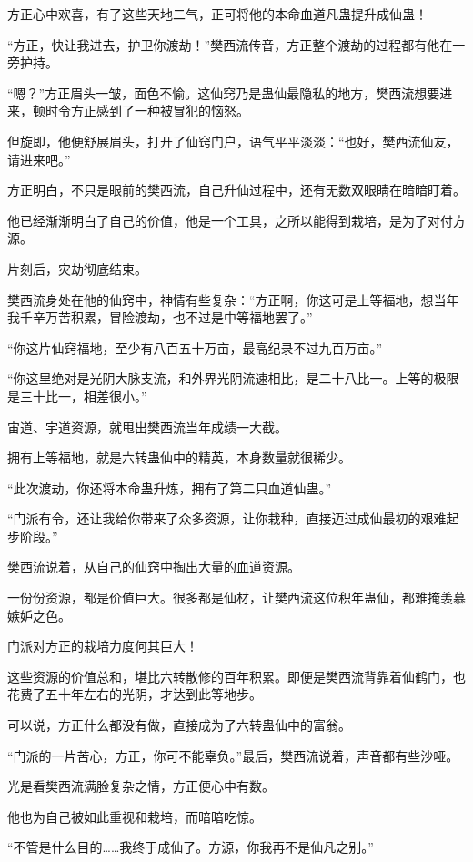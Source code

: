 \begin{this_body}
方正心中欢喜，有了这些天地二气，正可将他的本命血道凡蛊提升成仙蛊！

“方正，快让我进去，护卫你渡劫！”樊西流传音，方正整个渡劫的过程都有他在一旁护持。

“嗯？”方正眉头一皱，面色不愉。这仙窍乃是蛊仙最隐私的地方，樊西流想要进来，顿时令方正感到了一种被冒犯的恼怒。

但旋即，他便舒展眉头，打开了仙窍门户，语气平平淡淡：“也好，樊西流仙友，请进来吧。”

方正明白，不只是眼前的樊西流，自己升仙过程中，还有无数双眼睛在暗暗盯着。

他已经渐渐明白了自己的价值，他是一个工具，之所以能得到栽培，是为了对付方源。

片刻后，灾劫彻底结束。

樊西流身处在他的仙窍中，神情有些复杂：“方正啊，你这可是上等福地，想当年我千辛万苦积累，冒险渡劫，也不过是中等福地罢了。”

“你这片仙窍福地，至少有八百五十万亩，最高纪录不过九百万亩。”

“你这里绝对是光阴大脉支流，和外界光阴流速相比，是二十八比一。上等的极限是三十比一，相差很小。”

宙道、宇道资源，就甩出樊西流当年成绩一大截。

拥有上等福地，就是六转蛊仙中的精英，本身数量就很稀少。

“此次渡劫，你还将本命蛊升炼，拥有了第二只血道仙蛊。”

“门派有令，还让我给你带来了众多资源，让你栽种，直接迈过成仙最初的艰难起步阶段。”

樊西流说着，从自己的仙窍中掏出大量的血道资源。

一份份资源，都是价值巨大。很多都是仙材，让樊西流这位积年蛊仙，都难掩羡慕嫉妒之色。

门派对方正的栽培力度何其巨大！

这些资源的价值总和，堪比六转散修的百年积累。即便是樊西流背靠着仙鹤门，也花费了五十年左右的光阴，才达到此等地步。

可以说，方正什么都没有做，直接成为了六转蛊仙中的富翁。

“门派的一片苦心，方正，你可不能辜负。”最后，樊西流说着，声音都有些沙哑。

光是看樊西流满脸复杂之情，方正便心中有数。

他也为自己被如此重视和栽培，而暗暗吃惊。

“不管是什么目的……我终于成仙了。方源，你我再不是仙凡之别。”


\end{this_body}
